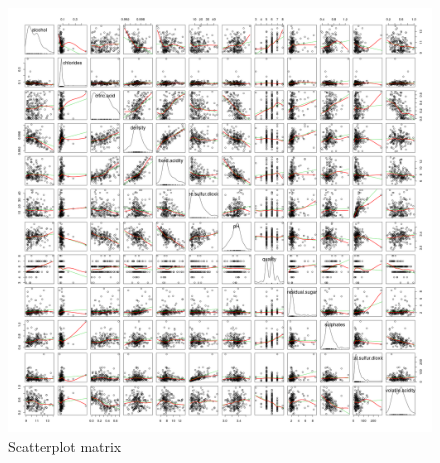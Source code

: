 \documentclass[11pt,a4paper]{article}
\begin{document}
\begin{figure}
	
	\includegraphics[width=\textwidth,keepaspectratio]{"scatterplot"}
	
	\caption{Scatterplot matrix}
	\label{fig:scatterplot}
\end{figure}
\FloatBarrier
\end{document}
